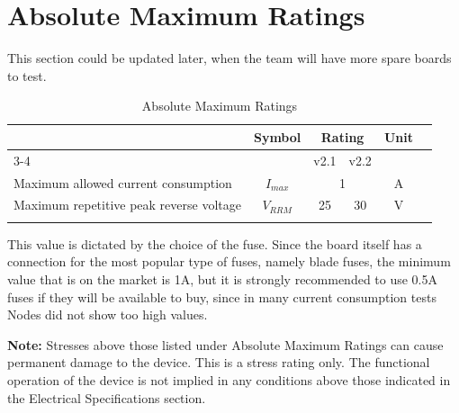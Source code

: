 \documentclass[10pt]{datasheet}
\begin{document}
\section{Absolute Maximum Ratings}
This section could be updated later, when the team will have more spare boards to test.
\begin{table}[h]
\begin{threeparttable}
\caption{Absolute Maximum Ratings}
\begin{tabularx}{\textwidth}{l | c | c | c | c X}
    \thickhline
    \multirow{2}{*}{\textbf{Parameter}} & \multirow{2}{*}{\textbf{Symbol}} & \multicolumn{2}{c|}{\textbf{Rating}} & \multirow{2}{*}{\textbf{Unit}}  %
    \\
    \cline{3-4}
    & &v2.1 &v2.2 &
    \\
    \hline
    Maximum allowed current consumption & $I_{max}$ & \multicolumn{2}{c|}{1\tnote{1}} & A\\
    \hline
    {Maximum repetitive peak reverse voltage} & $V_{RRM}$ & 25\tnote{\cite{ref2}} & 30\tnote{\cite{ref3}} & V \\
    \thickhline
\end{tabularx}
\begin{tablenotes}
\item[1]{This value is dictated by the choice of the fuse. Since the board itself has a connection for the most popular type of fuses, namely blade fuses, the minimum value that is on the market is 1A, but it is strongly recommended to use 0.5A fuses if they will be available to buy, since in many current consumption tests Nodes did not show too high values.}
\end{tablenotes}
\end{threeparttable}
\end{table}

\textbf{Note:} Stresses above those listed under Absolute Maximum Ratings can
cause permanent damage to the device. This is a stress rating only. The functional
operation of the device is not implied in any conditions above those indicated
in the Electrical Specifications section.
\newpage
\end{document}
